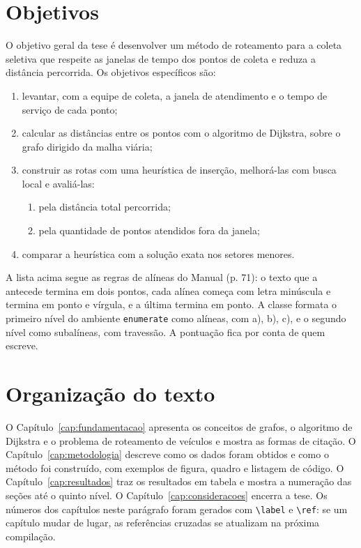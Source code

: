 \documentclass[tese,capa]{texufpel}
\begin{document}
\section{Objetivos}
\label{sec:objetivos}

O objetivo geral da tese é desenvolver um método de roteamento para a coleta
seletiva que respeite as janelas de tempo dos pontos de coleta e reduza a
distância percorrida. Os objetivos específicos são:

\begin{enumerate}
  \item levantar, com a equipe de coleta, a janela de atendimento e o tempo de
        serviço de cada ponto;
  \item calcular as distâncias entre os pontos com o algoritmo de Dijkstra,
        sobre o grafo dirigido da malha viária;
  \item construir as rotas com uma heurística de inserção, melhorá-las com
        busca local e avaliá-las:
  \begin{enumerate}
    \item pela distância total percorrida;
    \item pela quantidade de pontos atendidos fora da janela;
  \end{enumerate}
  \item comparar a heurística com a solução exata nos setores menores.
\end{enumerate}

A lista acima segue as regras de alíneas do Manual (p. 71): o texto que a
antecede termina em dois pontos, cada alínea começa com letra minúscula e
termina em ponto e vírgula, e a última termina em ponto. A classe formata o
primeiro nível do ambiente \texttt{enumerate} como alíneas, com a), b), c), e o
segundo nível como subalíneas, com travessão. A pontuação fica por conta de
quem escreve.

\section{Organização do texto}

O Capítulo~\ref{cap:fundamentacao} apresenta os conceitos de grafos, o
algoritmo de Dijkstra e o problema de roteamento de veículos e mostra as
formas de citação. O Capítulo~\ref{cap:metodologia} descreve como os dados
foram obtidos e como o método foi construído, com exemplos de figura, quadro
e listagem de código. O Capítulo~\ref{cap:resultados} traz os resultados em
tabela e mostra a numeração das seções até o quinto nível. O
Capítulo~\ref{cap:consideracoes} encerra a tese. Os números dos capítulos
neste parágrafo foram gerados com \verb|\label| e \verb|\ref|: se um capítulo
mudar de lugar, as referências cruzadas se atualizam na próxima compilação.
\end{document}
